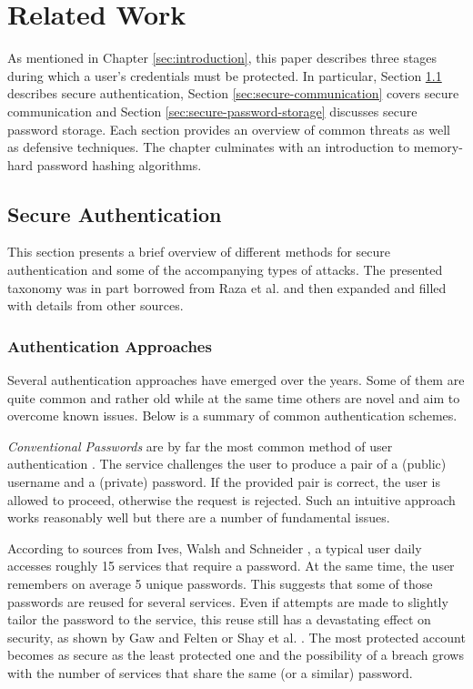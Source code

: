 \chapter{Related Work}
\label{chapter:related-work}

As mentioned in Chapter \ref{sec:introduction}, this paper describes three stages during which a user's credentials must be protected. In particular, Section \ref{sec:secure-authentication} describes secure authentication, Section \ref{sec:secure-communication} covers secure communication and Section \ref{sec:secure-password-storage} discusses secure password storage. Each section provides an overview of common threats as well as defensive techniques. The chapter culminates with an introduction to memory-hard password hashing algorithms.

\section{Secure Authentication}
\label{sec:secure-authentication}

This section presents a brief overview of different methods for secure authentication and some of the accompanying types of attacks. The presented taxonomy was in part borrowed from Raza et al. \cite{raza:2012:password-attacks-survey} and then expanded and filled with details from other sources.

\subsection{Authentication Approaches}
\label{sec:authentication-approaches}

Several authentication approaches have emerged over the years. Some of them are quite common and rather old while at the same time others are novel and aim to overcome known issues. Below is a summary of common authentication schemes.

\emph{Conventional Passwords} are by far the most common method of user authentication \cite{bonneau:2015:passwords-and-evolution-of-auth}. The service challenges the user to produce a pair of a (public) username and a (private) password. If the provided pair is correct, the user is allowed to proceed, otherwise the request is rejected. Such an intuitive approach works reasonably well but there are a number of fundamental issues.

 According to sources from Ives, Walsh and Schneider \cite{ives:2004:domino}, a typical user daily accesses roughly 15 services that require a password. At the same time, the user remembers on average 5 unique passwords. This suggests that some of those passwords are reused for several services. Even if attempts are made to slightly tailor the password to the service, this reuse still has a devastating effect on security, as shown by Gaw and Felten \cite{gaw:2006:password} or Shay et al. \cite{shay2010encountering}. The most protected account becomes as secure as the least protected one and the possibility of a breach grows with the number of services that share the same (or a similar) password.

